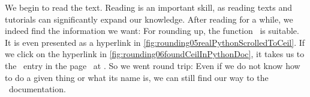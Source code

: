We begin to read the text.
Reading is an important skill, as reading texts and tutorials can significantly expand our knowledge.
After reading for a while, we indeed find the information we want:
For rounding up, the function~ is suitable.
It is even presented as a hyperlink in \cref{fig:rounding05realPythonScrolledToCeil}.
If we click on the hyperlink in \cref{fig:rounding06foundCeilInPythonDoc}, it takes us to the ~entry in the  page~\cite{PSF:P3D:TPSL:MMF} at .
So we went round trip:
Even if we do not know how to do a given thing or what its name is, we can still find our way to the \python\ documentation.%
%
%
%
